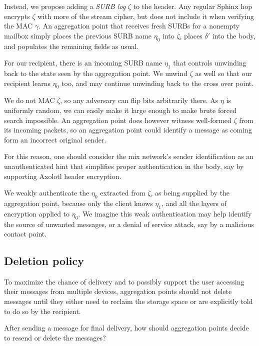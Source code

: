 Instead, we propose adding a {\it SURB log} $\zeta$ to the header.
Any regular Sphinx hop encrypts $\zeta$ with more of the stream
cipher, but does not include it when verifying the MAC $\gamma$.
An aggregation point that receives fresh SURBs for a nonempty
mailbox simply places the previous SURB name $\eta_0$ into $\zeta$,
places $\delta'$ into the body, and populates the remaining fields
as usual.

For our recipient, there is an incoming SURB name $\eta_1$ that 
controls unwinding back to the state seen by the aggregation point.
We unwind $\zeta$ as well so that our recipient learns $\eta_0$ too,
and may continue unwinding back to the cross over point.

We do not MAC $\zeta$, so any adversary can flip bits arbitrarily
there.  As $\eta$ is uniformly random, we can easily make it large
enough to make brute forced search impossible.  An aggregation point
does however witness well-formed $\zeta$ from its incoming packets,
so an aggregation point could identify a message as coming form an
incorrect original sender.

For this reason, one should consider the mix network's sender
identification as an unauthenticated hint that simplifies proper
authentication in the body, say by supporting Axolotl header
encryption.  

We weakly authenticate the $\eta_0$ extracted from $\zeta$,
as being supplied by the aggregation point, because only the client
knows $\eta_1$, and all the layers of encryption applied to $\eta_0$.  
We imagine this weak authentication may help identify the source of
unwanted messages, or a denial of service attack, say by a malicious
contact point.


\subsection{Deletion policy}

To maximize the chance of delivery and to possibly support the user
accessing their messages from multiple devices, aggregation points
should not delete messages until they either need to reclaim the
storage space or are explicitly told to do so by the recipient.

\begin{issue}
After sending a message for final delivery, how should aggregation
points decide to resend or delete the messages?
\end{issue}

